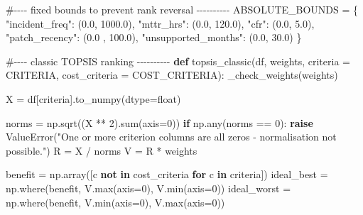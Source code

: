 \documentclass[
  12pt,
  letterpaper,
  12pt,
  oneside,
  english,
  onehalfspacing,
  headsepline]{MastersDoctoralThesis}
\newenvironment{Shaded}{\begin{snugshade}}{\end{snugshade}}
\newcommand{\BuiltInTok}[1]{\textcolor[rgb]{0.00,0.23,0.31}{#1}}
\newcommand{\CommentTok}[1]{\textcolor[rgb]{0.37,0.37,0.37}{#1}}
\newcommand{\ControlFlowTok}[1]{\textcolor[rgb]{0.00,0.23,0.31}{\textbf{#1}}}
\newcommand{\DecValTok}[1]{\textcolor[rgb]{0.68,0.00,0.00}{#1}}
\newcommand{\FloatTok}[1]{\textcolor[rgb]{0.68,0.00,0.00}{#1}}
\newcommand{\KeywordTok}[1]{\textcolor[rgb]{0.00,0.23,0.31}{\textbf{#1}}}
\newcommand{\NormalTok}[1]{\textcolor[rgb]{0.00,0.23,0.31}{#1}}
\newcommand{\OperatorTok}[1]{\textcolor[rgb]{0.37,0.37,0.37}{#1}}
\newcommand{\PreprocessorTok}[1]{\textcolor[rgb]{0.68,0.00,0.00}{#1}}
\newcommand{\StringTok}[1]{\textcolor[rgb]{0.13,0.47,0.30}{#1}}
\begin{document}
\begin{Shaded}
\begin{Highlighting}[]
\CommentTok{\#{-}{-}{-}{-} fixed bounds to prevent rank reversal {-}{-}{-}{-}{-}{-}{-}{-}{-}{-}}
\NormalTok{ABSOLUTE\_BOUNDS }\OperatorTok{=}\NormalTok{ \{}
    \StringTok{"incident\_freq"}\NormalTok{: (}\FloatTok{0.0}\NormalTok{, }\FloatTok{1000.0}\NormalTok{),}
    \StringTok{"mttr\_hrs"}\NormalTok{: (}\FloatTok{0.0}\NormalTok{, }\FloatTok{120.0}\NormalTok{),}
    \StringTok{"cfr"}\NormalTok{: (}\FloatTok{0.0}\NormalTok{, }\FloatTok{5.0}\NormalTok{),}
    \StringTok{"patch\_recency"}\NormalTok{: (}\FloatTok{0.0}\NormalTok{ , }\FloatTok{100.0}\NormalTok{),}
    \StringTok{"unsupported\_months"}\NormalTok{: (}\FloatTok{0.0}\NormalTok{, }\FloatTok{30.0}\NormalTok{)}
\NormalTok{\}}

\CommentTok{\#{-}{-}{-}{-} classic TOPSIS ranking {-}{-}{-}{-}{-}{-}{-}{-}{-}{-}}
\KeywordTok{def}\NormalTok{ topsis\_classic(df, weights, criteria }\OperatorTok{=}\NormalTok{ CRITERIA, cost\_criteria }\OperatorTok{=}\NormalTok{ COST\_CRITERIA):}
\NormalTok{    \_check\_weights(weights)}

\NormalTok{    X }\OperatorTok{=}\NormalTok{ df[criteria].to\_numpy(dtype}\OperatorTok{=}\BuiltInTok{float}\NormalTok{)}

\NormalTok{    norms }\OperatorTok{=}\NormalTok{ np.sqrt((X }\OperatorTok{**} \DecValTok{2}\NormalTok{).}\BuiltInTok{sum}\NormalTok{(axis}\OperatorTok{=}\DecValTok{0}\NormalTok{))}
    \ControlFlowTok{if}\NormalTok{ np.}\BuiltInTok{any}\NormalTok{(norms }\OperatorTok{==} \DecValTok{0}\NormalTok{):}
        \ControlFlowTok{raise} \PreprocessorTok{ValueError}\NormalTok{(}\StringTok{"One or more criterion columns are all zeros {-} normalisation not possible."}\NormalTok{)}
\NormalTok{    R }\OperatorTok{=}\NormalTok{ X }\OperatorTok{/}\NormalTok{ norms}
\NormalTok{    V }\OperatorTok{=}\NormalTok{ R }\OperatorTok{*}\NormalTok{ weights}

\NormalTok{    benefit }\OperatorTok{=}\NormalTok{ np.array([c }\KeywordTok{not} \KeywordTok{in}\NormalTok{ cost\_criteria }\ControlFlowTok{for}\NormalTok{ c }\KeywordTok{in}\NormalTok{ criteria])}
\NormalTok{    ideal\_best }\OperatorTok{=}\NormalTok{ np.where(benefit, V.}\BuiltInTok{max}\NormalTok{(axis}\OperatorTok{=}\DecValTok{0}\NormalTok{), V.}\BuiltInTok{min}\NormalTok{(axis}\OperatorTok{=}\DecValTok{0}\NormalTok{))}
\NormalTok{    ideal\_worst }\OperatorTok{=}\NormalTok{ np.where(benefit, V.}\BuiltInTok{min}\NormalTok{(axis}\OperatorTok{=}\DecValTok{0}\NormalTok{), V.}\BuiltInTok{max}\NormalTok{(axis}\OperatorTok{=}\DecValTok{0}\NormalTok{))}


\end{Highlighting}
\end{Shaded}
\end{document}
